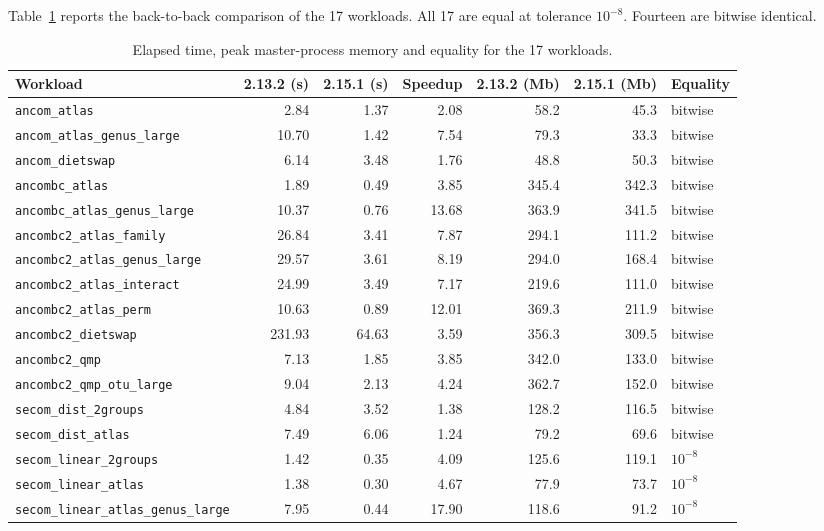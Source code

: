 \documentclass[11pt]{article}
\newcommand{\code}[1]{\texttt{#1}}
\begin{document}
Table~\ref{tab:timings} reports the back-to-back comparison of the 17
workloads. All 17 are equal at tolerance $10^{-8}$. Fourteen are bitwise
identical.

\begin{table}[htbp]
\centering
\footnotesize
\setlength{\tabcolsep}{5pt}
\caption{Elapsed time, peak master-process memory and equality for the 17
workloads.}
\label{tab:timings}
\begin{tabular}{l r r r r r l}
\toprule
Workload & 2.13.2 (s) & 2.15.1 (s) & Speedup & 2.13.2 (Mb) & 2.15.1 (Mb) &
Equality \\
\midrule
\code{ancom\_atlas}                     &   2.84 &  1.37 &  2.08 &  58.2 &  45.3 & bitwise \\
\code{ancom\_atlas\_genus\_large}       &  10.70 &  1.42 &  7.54 &  79.3 &  33.3 & bitwise \\
\code{ancom\_dietswap}                  &   6.14 &  3.48 &  1.76 &  48.8 &  50.3 & bitwise \\
\code{ancombc\_atlas}                   &   1.89 &  0.49 &  3.85 & 345.4 & 342.3 & bitwise \\
\code{ancombc\_atlas\_genus\_large}     &  10.37 &  0.76 & 13.68 & 363.9 & 341.5 & bitwise \\
\code{ancombc2\_atlas\_family}          &  26.84 &  3.41 &  7.87 & 294.1 & 111.2 & bitwise \\
\code{ancombc2\_atlas\_genus\_large}    &  29.57 &  3.61 &  8.19 & 294.0 & 168.4 & bitwise \\
\code{ancombc2\_atlas\_interact}        &  24.99 &  3.49 &  7.17 & 219.6 & 111.0 & bitwise \\
\code{ancombc2\_atlas\_perm}            &  10.63 &  0.89 & 12.01 & 369.3 & 211.9 & bitwise \\
\code{ancombc2\_dietswap}               & 231.93 & 64.63 &  3.59 & 356.3 & 309.5 & bitwise \\
\code{ancombc2\_qmp}                    &   7.13 &  1.85 &  3.85 & 342.0 & 133.0 & bitwise \\
\code{ancombc2\_qmp\_otu\_large}        &   9.04 &  2.13 &  4.24 & 362.7 & 152.0 & bitwise \\
\code{secom\_dist\_2groups}             &   4.84 &  3.52 &  1.38 & 128.2 & 116.5 & bitwise \\
\code{secom\_dist\_atlas}               &   7.49 &  6.06 &  1.24 &  79.2 &  69.6 & bitwise \\
\code{secom\_linear\_2groups}           &   1.42 &  0.35 &  4.09 & 125.6 & 119.1 & $10^{-8}$ \\
\code{secom\_linear\_atlas}             &   1.38 &  0.30 &  4.67 &  77.9 &  73.7 & $10^{-8}$ \\
\code{secom\_linear\_atlas\_genus\_large} & 7.95 &  0.44 & 17.90 & 118.6 &  91.2 & $10^{-8}$ \\
\bottomrule
\end{tabular}
\end{table}
\end{document}

